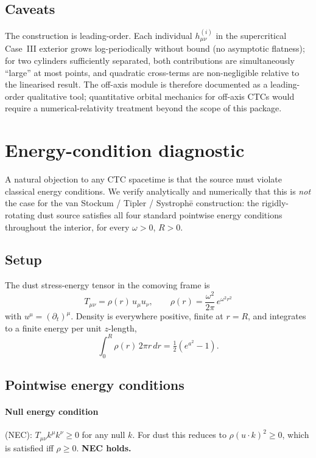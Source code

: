 \documentclass[11pt,a4paper]{article}
\begin{document}
\subsection{Caveats}

The construction is leading-order. Each individual
$h^{(i)}_{\mu\nu}$ in the supercritical Case~III exterior grows
log-periodically without bound (no asymptotic flatness); for two
cylinders sufficiently separated, both contributions are simultaneously
``large'' at most points, and quadratic cross-terms are non-negligible
relative to the linearised result. The off-axis module is therefore
documented as a leading-order qualitative tool; quantitative orbital
mechanics for off-axis CTCs would require a numerical-relativity
treatment beyond the scope of this package.

\section{Energy-condition diagnostic}
\label{sec:ec}

A natural objection to any CTC spacetime is that the source must violate
classical energy conditions. We verify analytically and numerically
that this is \emph{not} the case for the van Stockum / Tipler / Systroph\=e
construction: the rigidly-rotating dust source satisfies all four
standard pointwise energy conditions throughout the interior, for every
$\omega > 0$, $R > 0$.

\subsection{Setup}

The dust stress-energy tensor in the comoving frame is
\begin{equation}
T_{\mu\nu} = \rho(r)\,u_\mu u_\nu, \qquad
\rho(r) = \frac{\omega^2}{2\pi}\,e^{\omega^2 r^2}
\end{equation}
with $u^\mu = (\partial_t)^\mu$. Density is everywhere positive, finite
at $r = R$, and integrates to a finite energy per unit $z$-length,
\begin{equation}
\int_0^R \rho(r)\,2\pi r\,dr
= \tfrac{1}{2}\!\left( e^{a^2} - 1 \right).
\end{equation}

\subsection{Pointwise energy conditions}

\paragraph{Null energy condition} (NEC): $T_{\mu\nu} k^\mu k^\nu \ge 0$
for any null $k$. For dust this reduces to $\rho (u\cdot k)^2 \ge 0$,
which is satisfied iff $\rho \ge 0$. \textbf{NEC holds.}
\end{document}
